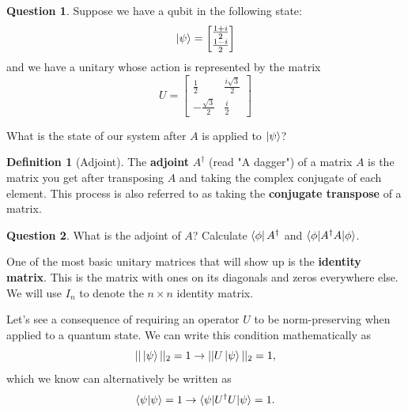 \documentclass[letterpaper, 12pt]{article}
\newcommand{\1}{\mathds{1}}	%
\theoremstyle{definition}
\newtheorem{definition}[theorem]{Definition}
\newtheorem{question}{Question}
\begin{document}
\begin{question}
    Suppose we have a qubit in the following state:
    \begin{equation}
        \ket{\psi} = \begin{bmatrix}
            \frac{1+i}{2} \\ \frac{1 - i}{2}
        \end{bmatrix}
    \end{equation}
    and we have a unitary whose action is represented by the matrix 
    \begin{equation}
        U = \begin{bmatrix}
            \frac{1}{2} & \frac{i\sqrt{3}}{2} \\ 
            -\frac{\sqrt{3}}{2} & \frac{i}{2}
        \end{bmatrix}
    \end{equation}

    What is the state of our system after $A$ is applied to $\ket{\psi}$? 
\end{question}
\vspace{30mm}

\begin{definition}[Adjoint]
    The \textbf{adjoint} $A^\dagger$ (read "A dagger") of a matrix $A$ is the matrix you get after transposing $A$ and taking the complex conjugate of each element. This process is also referred to as taking the \textbf{conjugate transpose} of a matrix.
\end{definition}

\begin{question}
    What is the adjoint of $A$? Calculate $\bra{\phi}A^\dagger$ and $\braket{\phi|A^\dagger A|\phi}$. 
\end{question}
\newpage 


One of the most basic unitary matrices that will show up is the \textbf{identity matrix}. This is the matrix with ones on its diagonals and zeros everywhere else. We will use $I_n$ to denote the $n \times n$ identity matrix.

Let's see a consequence of requiring an operator $U$ to be norm-preserving when applied to a quantum state. We can write this condition mathematically as 
\begin{equation}
    || \ket{\psi} ||_2 = 1 \rightarrow ||U \ket{\psi} || _2 = 1,
\end{equation}
which we know can alternatively be written as 
\begin{equation}
    \braket{\psi | \psi} = 1 \rightarrow \braket{\psi | U^\dagger U | \psi} = 1. 
\end{equation}
\end{document}
